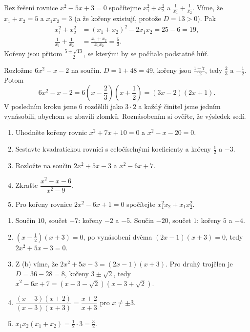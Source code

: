 \begin{example}
  Bez řešení rovnice $x^2 - 5x + 3 = 0$ spočítejme $x_1^2 + x_2^2$ a $\frac{1}{x_1} + \frac{1}{x_2}$. Víme, že $x_1 + x_2 = 5$ a $x_1x_2 = 3$ (a že kořeny existují, protože $D = 13 > 0$). Pak
  \begin{align*}
    x_1^2 + x_2^2 &= {(x_1 + x_2)}^2 - 2x_1x_2 = 25 - 6 = 19,\\
    \frac{1}{x_1} + \frac{1}{x_2} &= \frac{x_1 + x_2}{x_1x_2} = \frac{5}{3}.
  \end{align*}
  Kořeny jsou přitom $\frac{5\pm\sqrt{13}}{2}$, se kterými by se počítalo podstatně hůř.
\end{example}

\begin{example}
  Rozložme $6x^2 - x - 2$ na součin. $D = 1 + 48 = 49$, kořeny jsou $\frac{1\pm 7}{12}$, tedy $\frac{2}{3}$ a $-\frac{1}{2}$. Potom
  \begin{equation*}
    6x^2 - x - 2 = 6\left(x - \frac{2}{3}\right)\left(x + \frac{1}{2}\right) = (3x - 2)(2x + 1).
  \end{equation*}
  V posledním kroku jsme $6$ rozdělili jako $3\cdot 2$ a každý činitel jsme jedním vynásobili, abychom se zbavili zlomků. Roznásobením si ověřte, že výsledek sedí.
\end{example}

\begin{problem}
  \begin{enumerate}[label=(\alph*)]
    \item Uhodněte kořeny rovnic $x^2 + 7x + 10 = 0$ a $x^2 - x - 20 = 0$.
    \item Sestavte kvadratickou rovnici s celočíselnými koeficienty a kořeny $\frac{1}{2}$ a $-3$.
    \item Rozložte na součin $2x^2 + 5x - 3$ a $x^2 - 6x + 7$.
    \item Zkraťte $\dfrac{x^2 - x - 6}{x^2 - 9}$.
    \item Pro kořeny rovnice $2x^2 - 6x + 1 = 0$ spočítejte $x_1^2x_2 + x_1x_2^2$.
  \end{enumerate}
\end{problem}

\begin{solution}
  \begin{enumerate}[label=(\alph*)]
    \item Součin $10$, součet $-7$: kořeny $-2$ a $-5$. Součin $-20$, součet $1$: kořeny $5$ a $-4$.
    \item $\left(x - \frac{1}{2}\right)(x + 3) = 0$, po vynásobení dvěma $(2x - 1)(x + 3) = 0$, tedy $2x^2 + 5x - 3 = 0$.
    \item Z (b) víme, že $2x^2 + 5x - 3 = (2x - 1)(x + 3)$. Pro druhý trojčlen je $D = 36 - 28 = 8$, kořeny $3\pm\sqrt{2}$, tedy $x^2 - 6x + 7 = (x - 3 - \sqrt{2})(x - 3 + \sqrt{2})$.
    \item $\dfrac{(x - 3)(x + 2)}{(x - 3)(x + 3)} = \dfrac{x + 2}{x + 3}$ pro $x\neq\pm 3$.
    \item $x_1x_2(x_1 + x_2) = \frac{1}{2}\cdot 3 = \frac{3}{2}$.
  \end{enumerate}
\end{solution}

